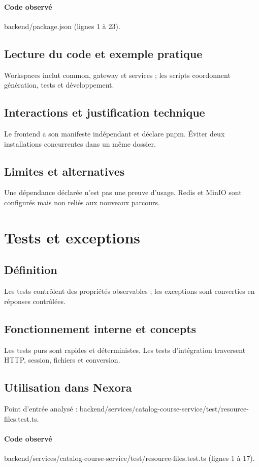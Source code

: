\paragraph{Code observé} backend/package.json (lignes 1 à 23).

\subsection*{Lecture du code et exemple pratique}
Workspaces inclut common, gateway et services ; les scripts coordonnent génération, tests et développement.

\subsection*{Interactions et justification technique}
Le frontend a son manifeste indépendant et déclare pnpm. Éviter deux installations concurrentes dans un même dossier.

\subsection*{Limites et alternatives}
Une dépendance déclarée n’est pas une preuve d’usage. Redis et MinIO sont configurés mais non reliés aux nouveaux parcours.

\section{Tests et exceptions}
\subsection*{Définition}
Les tests contrôlent des propriétés observables ; les exceptions sont converties en réponses contrôlées.

\subsection*{Fonctionnement interne et concepts}
Les tests purs sont rapides et déterministes. Les tests d’intégration traversent HTTP, session, fichiers et conversion.

\subsection*{Utilisation dans Nexora}
Point d’entrée analysé : backend/services/catalog-course-service/test/resource-files.test.ts.

\paragraph{Code observé} backend/services/catalog-course-service/test/resource-files.test.ts (lignes 1 à 17).

